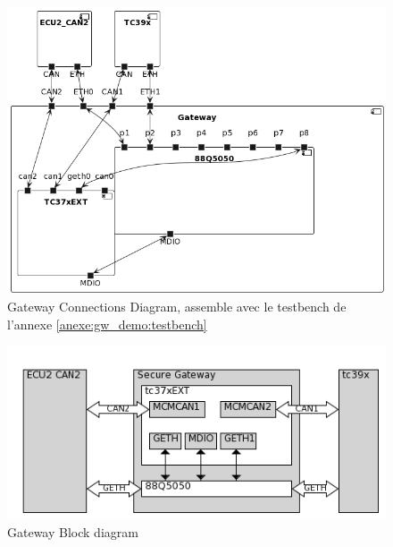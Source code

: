   

  

\begin{figure}[!htb] 

\centering 

\includegraphics[width=\textwidth]{img/GWConnectionsDiagram.png} 

\caption{Gateway Connections Diagram, assemble avec le testbench de l'annexe \ref{anexe:gw_demo:testbench}} 

\label{fig:connections-diagram} 

\end{figure} 

  

\begin{figure}[!htb] 

\centering 

\includegraphics[width=\textwidth]{img/gateway_block_diagram.png} 

\caption{Gateway Block diagram} 

\label{fig:block diagram} 

\end{figure} 

